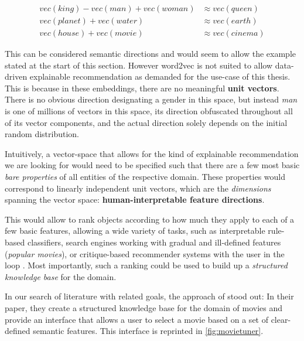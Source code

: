 \setlength{\belowdisplayskip}{3pt}
\vspace{-6.5ex}
\begin{align}
	vec(king) - vec(man) + vec(woman) &\approx vec(queen) \nonumber \\ 
	vec(planet) + vec(water) &\approx vec(earth)  \label{eq:w2vregularity}\\
	vec(house) + vec(movie) &\approx vec(cinema) \nonumber
\end{align}

This can be considered semantic directions and would seem to allow the example stated at the start of this section. However \gls{word2vec} is not suited to allow data-driven explainable recommendation as demanded for the use-case of this thesis. This is because in these embeddings, there are no meaningful \textbf{unit vectors}. There is no obvious direction designating a gender in this space, but instead \textit{man} is one of millions of vectors in this space, its direction obfuscated throughout all of its vector components, and the actual direction solely depends on the initial random distribution. 

Intuitively, a vector-space that allows for the kind of explainable recommendation we are looking for would need to be specified such that there are a few most basic \textit{bare properties} of all entities of the respective domain. These properties would correspond to linearly independent unit vectors, which are the \textit{dimensions} spanning the vector space: \textbf{human-interpretable feature directions}.

This would allow to rank objects according to how much they apply to each of a few basic features, allowing a wide variety of tasks, such as interpretable rule-based classifiers, search engines working with gradual and ill-defined features (\eg \textit{popular movies}), or critique-based recommender systems with the user in the loop \cite{Ager2018}. Most importantly, such a ranking could be used to build up a \textit{structured knowledge base} for the domain.

In our search of literature with related goals, the approach of \cite{VISR12} stood out: In their paper, they create a structured knowledge base for the domain of movies and provide an interface that allows a user to select a movie based on a set of clear-defined semantic features. This interface is reprinted in \autoref{fig:movietuner}.


